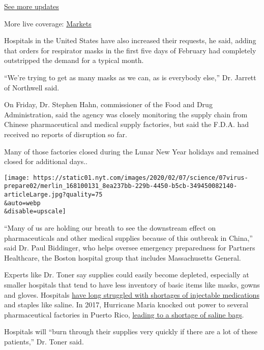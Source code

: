 \href{https://www.nytimes.com/2020/08/01/world/coronavirus-covid-19.html?action=click\&pgtype=Article\&state=default\&region=MAIN_CONTENT_1\&context=storylines_live_updates}{See
more updates}

More live coverage:
\href{https://www.nytimes.com/live/2020/07/31/business/stock-market-today-coronavirus?action=click\&pgtype=Article\&state=default\&region=MAIN_CONTENT_1\&context=storylines_live_updates}{Markets}

Hospitals in the United States have also increased their requests, he
said, adding that orders for respirator masks in the first five days of
February had completely outstripped the demand for a typical month.

``We're trying to get as many masks as we can, as is everybody else,''
Dr. Jarrett of Northwell said.

On Friday, Dr. Stephen Hahn, commissioner of the Food and Drug
Administration, said the agency was closely monitoring the supply chain
from Chinese pharmaceutical and medical supply factories, but said the
F.D.A. had received no reports of disruption so far.

Many of those factories closed during the Lunar New Year holidays and
remained closed for additional days..

\texttt{[image: https://static01.nyt.com/images/2020/02/07/science/07virus-prepare02/merlin\_168100131\_8ea237bb-229b-4450-b5cb-349450082140-articleLarge.jpg?quality=75\\\&auto=webp\\\&disable=upscale]}

``Many of us are holding our breath to see the downstream effect on
pharmaceuticals and other medical supplies because of this outbreak in
China,'' said Dr. Paul Biddinger, who helps oversee emergency
preparedness for Partners Healthcare, the Boston hospital group that
includes Massachusetts General.

Experts like Dr. Toner say supplies could easily become depleted,
especially at smaller hospitals that tend to have less inventory of
basic items like masks, gowns and gloves. Hospitals
\href{https://www.nytimes.com/2019/10/29/health/drug-shortages-generics.html}{have
long struggled with shortages of injectable medications} and staples
like saline. In 2017, Hurricane Maria knocked out power to several
pharmaceutical factories in Puerto Rico,
\href{https://www.nytimes.com/2017/10/23/health/puerto-rico-hurricane-maria-drug-shortage.html}{leading
to a shortage of saline bags}.

Hospitals will ``burn through their supplies very quickly if there are a
lot of these patients,'' Dr. Toner said.

